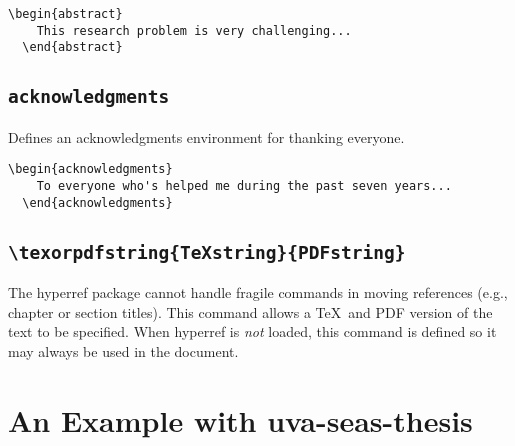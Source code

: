 \documentclass[10pt]{article}
\newcommand{\package}[1]{#1}
\newcommand{\environment}[1]{\texttt{#1}}
\newcommand{\command}[1]{\texttt{\textbackslash#1}}
\newcommand{\thispackage}{\package{uva-seas-thesis}}
\begin{document}
\begin{lstlisting}[gobble=2,float=h]
  \begin{abstract}
    This research problem is very challenging...
  \end{abstract}
\end{lstlisting}

\subsection{\environment{acknowledgments}}
Defines an acknowledgments environment for thanking everyone.

\begin{lstlisting}[gobble=2,float=h]
  \begin{acknowledgments}
    To everyone who's helped me during the past seven years...
  \end{acknowledgments}
\end{lstlisting}

\subsection{\command{texorpdfstring\{\TeX string\}\{PDFstring\}}}
The \package{hyperref} package cannot handle fragile commands in moving references (e.g., chapter or section titles).
This command allows a \TeX\ and PDF version of the text to be specified.
When \package{hyperref} is \emph{not} loaded, this command is defined so it may always be used in the document.

\section{An Example with \thispackage}\label{section:example}



\end{document}

